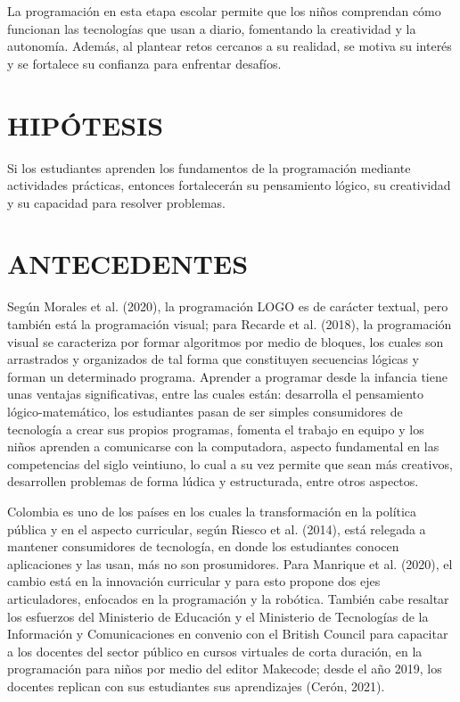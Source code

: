 \documentclass[12pt,letterpaper]{article}
\begin{document}
La programación en esta etapa escolar permite que los niños comprendan cómo funcionan las tecnologías que usan a diario, fomentando la creatividad y la autonomía. Además, al plantear retos cercanos a su realidad, se motiva su interés y se fortalece su confianza para enfrentar desafíos.

\section{HIPÓTESIS}
\noindent Si los estudiantes aprenden los fundamentos de la programación mediante actividades prácticas, entonces fortalecerán su pensamiento lógico, su creatividad y su capacidad para resolver problemas.

\section{ANTECEDENTES}
Según Morales et al. (2020), la programación LOGO es de carácter textual, pero también está la programación visual; para Recarde et al. (2018), la programación visual se caracteriza por formar algoritmos por medio de bloques, los cuales son arrastrados y organizados de tal forma que constituyen secuencias lógicas y forman un determinado programa. Aprender a programar desde la infancia tiene unas ventajas significativas, entre las cuales están: desarrolla el pensamiento lógico-matemático, los estudiantes pasan de ser simples consumidores de tecnología a crear sus propios programas, fomenta el trabajo en equipo y los niños aprenden a comunicarse con la computadora, aspecto fundamental en las competencias del siglo veintiuno, lo cual a su vez permite que sean más creativos, desarrollen problemas de forma lúdica y estructurada, entre otros aspectos.

Colombia es uno de los países en los cuales la transformación en la política pública y en el aspecto curricular, según Riesco et al. (2014), está relegada a mantener consumidores de tecnología, en donde los estudiantes conocen aplicaciones y las usan, más no son prosumidores. Para Manrique et al. (2020), el cambio está en la innovación curricular y para esto propone dos ejes articuladores, enfocados en la programación y la robótica. También cabe resaltar los esfuerzos del Ministerio de Educación y el Ministerio de Tecnologías de la Información y Comunicaciones en convenio con el British Council para capacitar a los docentes del sector público en cursos virtuales de corta duración, en la programación para niños por medio del editor Makecode; desde el año 2019, los docentes replican con sus estudiantes sus aprendizajes (Cerón, 2021).
\end{document}
